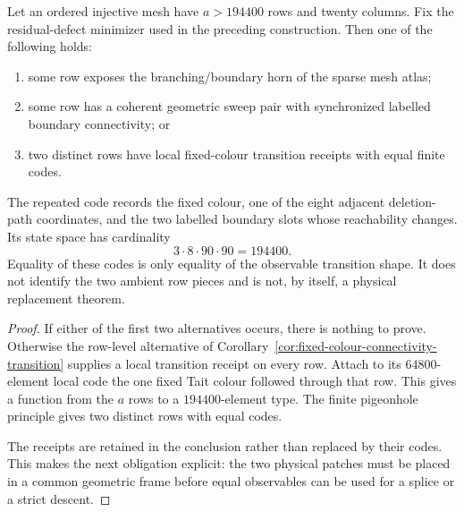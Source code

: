 \begin{corollary}
\label{cor:fixed-colour-row-transition-repetition}
Let an ordered injective mesh have $a>194400$ rows and twenty columns.
Fix the residual-defect minimizer used in the preceding construction.  Then
one of the following holds:
\begin{enumerate}
  \item some row exposes the branching/boundary horn of the sparse mesh
        atlas;
  \item some row has a coherent geometric sweep pair with synchronized
        labelled boundary connectivity; or
  \item two distinct rows have local fixed-colour transition receipts with
        equal finite codes.
\end{enumerate}
The repeated code records the fixed colour, one of the eight adjacent
deletion-path coordinates, and the two labelled boundary slots whose
reachability changes.  Its state space has cardinality
\[
                   3\cdot8\cdot90\cdot90=194400.
\]
Equality of these codes is only equality of the observable transition shape.
It does not identify the two ambient row pieces and is not, by itself, a
physical replacement theorem.
\end{corollary}

\begin{proof}
If either of the first two alternatives occurs, there is nothing to prove.
Otherwise the row-level alternative of
Corollary~\ref{cor:fixed-colour-connectivity-transition} supplies a local
transition receipt on every row.  Attach to its $64800$-element local code
the one fixed Tait colour followed through that row.  This gives a function
from the $a$ rows to a $194400$-element type.  The finite pigeonhole principle
gives two distinct rows with equal codes.

The receipts are retained in the conclusion rather than replaced by their
codes.  This makes the next obligation explicit: the two physical patches
must be placed in a common geometric frame before equal observables can be
used for a splice or a strict descent.
\end{proof}

